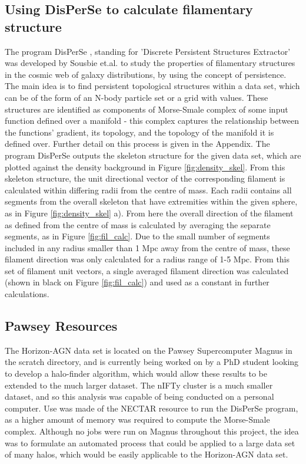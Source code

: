 \documentclass[journal]{IEEEtran}
\begin{document}
\subsection{Using DisPerSe to calculate filamentary structure}
The program DisPerSe \cite{sousbie11a}, standing for 'Discrete Persistent Structures Extractor' was developed by Sousbie et.al. to study the properties of filamentary structures in the cosmic web of galaxy distributions, by using the concept of persistence. The main idea is to find persistent topological structures within a data set, which can be of the form of an N-body particle set or a grid with values. These structures are identified as components of Morse-Smale complex of some input function defined over a manifold - this complex captures the relationship between the functions' gradient, its topology, and the topology of the manifold it is defined over. Further detail on this process is given in the Appendix.
The program DisPerSe outputs the skeleton structure for the given data set, which are plotted against the density background in Figure \ref{fig:density_skel}. From this skeleton structure, the unit directional vector of the corresponding filament is calculated within differing radii from the centre of mass. Each radii contains all segments from the overall skeleton that have extremities within the given sphere, as in Figure \ref{fig:density_skel} a). From here the overall direction of the filament as defined from the centre of mass is calculated by averaging the separate segments, as in Figure \ref{fig:fil_calc}. Due to the small number of segments included in any radius smaller than 1 Mpc away from the centre of mass, these filament direction was only calculated for a radius range of 1-5 Mpc. From this set of filament unit vectors, a single averaged filament direction was calculated (shown in black on Figure \ref{fig:fil_calc}) and used as a constant in further calculations.
\subsection{Pawsey Resources}
The Horizon-AGN data set is located on the Pawsey Supercomputer Magnus in the scratch directory, and is currently being worked on by a PhD student looking to develop a halo-finder algorithm, which would allow these results to be extended to the much larger dataset. The nIFTy cluster is a much smaller dataset, and so this analysis was capable of being conducted on a personal computer. Use was made of the NECTAR resource to run the DisPerSe program, as a higher amount of memory was required to compute the Morse-Smale complex. Although no jobs were run on Magnus throughout this project, the idea was to formulate an automated process that could be applied to a large data set of many halos, which would be easily applicable to the Horizon-AGN data set. 
\end{document}
